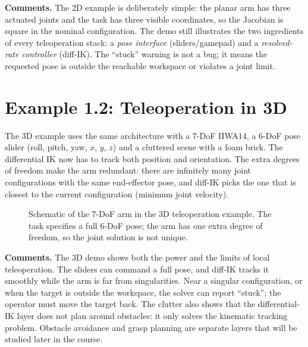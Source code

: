 \documentclass[11pt]{article}
\begin{document}
\textbf{Comments.}  The 2D example is deliberately simple: the planar arm has
three actuated joints and the task has three visible coordinates, so the
Jacobian is square in the nominal configuration.  The demo still illustrates
the two ingredients of every teleoperation stack: a \emph{pose interface}
(sliders/gamepad) and a \emph{resolved-rate controller} (diff-IK).  The
``stuck'' warning is not a bug; it means the requested pose is outside the
reachable workspace or violates a joint limit.

\section{Example 1.2: Teleoperation in 3D}

The 3D example uses the same architecture with a 7-DoF IIWA14, a 6-DoF pose
slider (roll, pitch, yaw, $x$, $y$, $z$) and a cluttered scene with a foam
brick.  The differential IK now has to track both position and orientation.
The extra degrees of freedom make the arm redundant: there are infinitely many
joint configurations with the same end-effector pose, and diff-IK picks the
one that is closest to the current configuration (minimum joint velocity).

\begin{figure}[htbp]
\centering
{}
\caption{Schematic of the 7-DoF arm in the 3D teleoperation example.  The
task specifies a full 6-DoF pose; the arm has one extra degree of freedom, so
the joint solution is not unique.}
\end{figure}

\textbf{Comments.}  The 3D demo shows both the power and the limits of local
teleoperation.  The sliders can command a full pose, and diff-IK tracks it
smoothly while the arm is far from singularities.  Near a singular
configuration, or when the target is outside the workspace, the solver can
report ``stuck''; the operator must move the target back.  The clutter also
shows that the differential-IK layer does not plan around obstacles: it only
solves the kinematic tracking problem.  Obstacle avoidance and grasp planning
are separate layers that will be studied later in the course.
\end{document}
